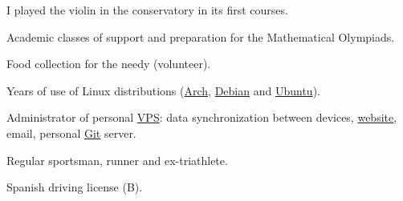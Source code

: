 

%
{\small {}%
  \small{}}\par%
I played the violin in the conservatory in its first courses.%
\divider{}

%
{Academic classes of support and preparation for the Mathematical Olympiads.}%
\divider{}

%
{\small {}%
  \small{}}\par%
Food collection for the needy (volunteer).%
 \divider{}

%
{Years of use of Linux distributions (\href{https://www.archlinux.org/}{Arch},
\href{https://www.debian.org/}{Debian} and \href{https://ubuntu.com/}{Ubuntu}).}%
\divider{}

%
{%
  Administrator of personal
  \href{https://en.wikipedia.org/wiki/Virtual_private_server}{VPS}: data
  synchronization between devices,
  \href{https://david.alvarezrosa.com}{website}, email, personal
  \href{https://en.wikipedia.org/wiki/Git}{Git} server.%
}%
\divider{}

%
{Regular sportsman, runner and ex-triathlete.}%
\divider{}

%
{\small {}%
  \small{}}\par%
Spanish driving license (B).


